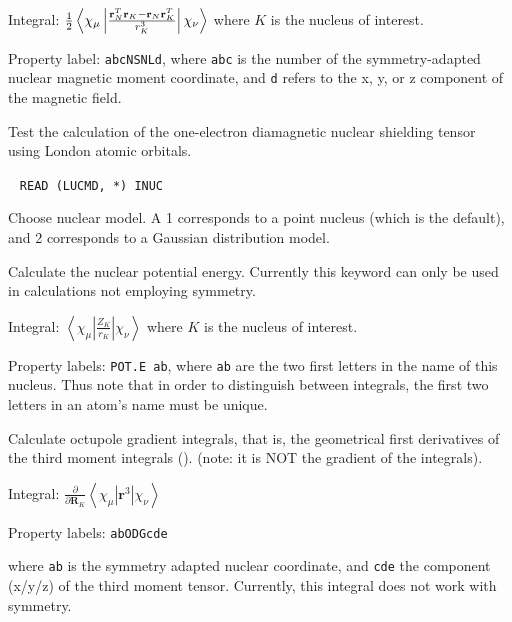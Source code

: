 \begin{description}
\begin{list}{}{}
\item Integral:
$\frac{1}{2}\left<\chi_{\mu}\left|\frac{{\bf r}_N^T{\bf r}_K -
{\bf r}_N{\bf r}_K^T}{r_{K}^3}\right|\chi_{\nu}\right>$
where $K$ is the nucleus of interest.
\item Property label: \verb|abcNSNLd|, where \verb|abc| is the number
of the symmetry-adapted nuclear magnetic moment coordinate, and
\verb|d| refers to the x, y, or z component of the magnetic field.
\end{list}

\item[\Key{NSTTST}] Test the calculation of the one-electron
diamagnetic  nuclear shielding
tensor using London atomic orbitals.

\item[\Key{NUCMOD}]\verb| |\newline
\verb|READ (LUCMD, *) INUC|

Choose nuclear model. A 1 corresponds to a point nucleus (which is the
default), and 2 corresponds to a Gaussian distribution model.

\item[\Key{NUCPOT}] Calculate the nuclear potential energy.
Currently this keyword can only be used in calculations not employing
symmetry.

\begin{list}{}{}
\item Integral:
$\left<\chi_{\mu}\left|\frac{Z_K}{r_{K}}\right|\chi_{\nu}\right>$
where $K$ is the nucleus of interest.
\item Property labels: \verb|POT.E ab|, where \verb|ab| are the two
first letters in the name of this nucleus. Thus note that in order
to distinguish between integrals, the first two letters in an
atom's name must be unique.
\end{list}


\item[\Key{OCTGRA}]
Calculate octupole gradient integrals, that is, the geometrical first
derivatives of the third moment integrals ().
(note: it is NOT the gradient of the  integrals).

\begin{list}{}{}
\item Integral: $\frac{\partial}{\partial {\mathbf
R}_K}\left<\chi_{\mu}\left|{\mathbf r}^3\right|\chi_{\nu}\right>$ 
\item Property labels: \verb|abODGcde|
\end{list}
where \verb|ab| is the symmetry adapted nuclear coordinate, and \verb|cde| the
component (x/y/z) of the third moment tensor. Currently, this integral
does not work with symmetry.


\end{description}
